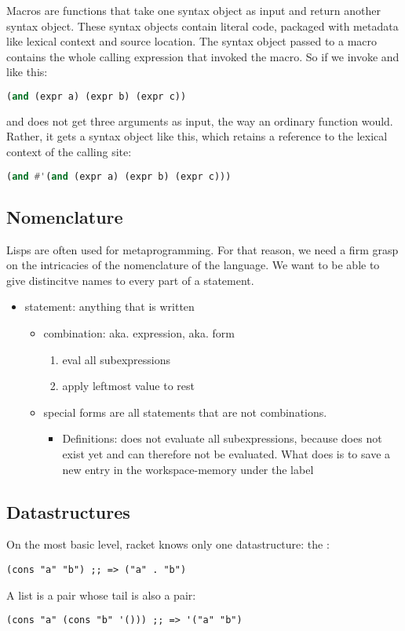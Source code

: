 Macros are func­tions that take one syntax object  as input and return another syntax object. These syntax objects contain literal code, pack­aged with meta­data like lexical context and source loca­tion.
The syntax object passed to a macro contains the whole calling expres­sion that invoked the macro. So if we invoke and like this:
\begin{lstlisting}[language=lisp]
(and (expr a) (expr b) (expr c))
\end{lstlisting}
and does not get three argu­ments as input, the way an ordi­nary func­tion would. Rather, it gets a syntax object like this, which retains a refer­ence to the lexical context of the calling site:
\begin{lstlisting}[language=lisp]
(and #'(and (expr a) (expr b) (expr c)))
\end{lstlisting}




\subsection{Nomenclature}

Lisps are often used for metaprogramming. For that reason, we need a firm grasp on the intricacies of the nomenclature of the language. We want to be able to give distincitve names to every part of a statement. 

\begin{itemize}
  \item statement: anything that is written 
  \begin{itemize}
    \item combination: aka. expression, aka. form 
    \begin{enumerate}
      \item eval all subexpressions
      \item apply leftmost value to rest
    \end{enumerate}
  \item special forms are all statements that are not combinations. 
  \begin{itemize}
    \item Definitions:  does not evaluate all subexpressions, because  does not exist yet and can therefore not be evaluated. What  does is to save a new entry in the workspace-memory under the label 
  \end{itemize}
  \end{itemize}
\end{itemize}


\subsection{Datastructures}
On the most basic level, racket knows only one datastructure: the :
\begin{lstlisting}
(cons "a" "b") ;; => ("a" . "b")
\end{lstlisting}
A list is a pair whose tail is also a pair:
\begin{lstlisting}
(cons "a" (cons "b" '())) ;; => '("a" "b")
\end{lstlisting}

